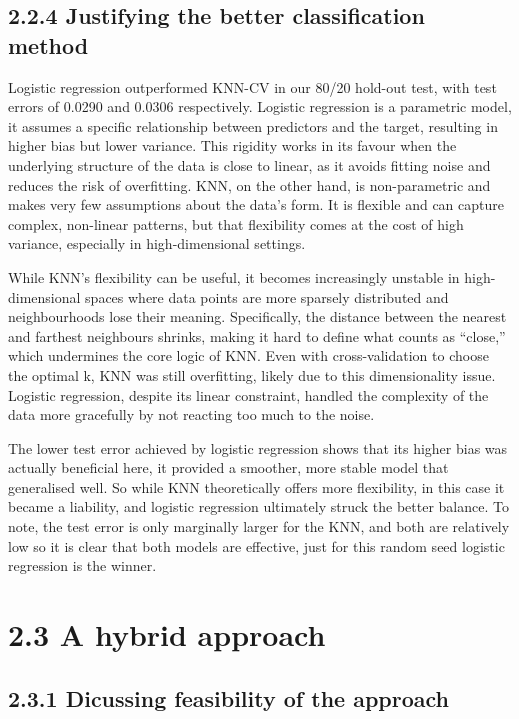 \documentclass[
]{article}
\begin{document}
\subsection{2.2.4 Justifying the better classification
method}\label{justifying-the-better-classification-method-1}

Logistic regression outperformed KNN-CV in our 80/20 hold-out test, with
test errors of 0.0290 and 0.0306 respectively. Logistic regression is a
parametric model, it assumes a specific relationship between predictors
and the target, resulting in higher bias but lower variance. This
rigidity works in its favour when the underlying structure of the data
is close to linear, as it avoids fitting noise and reduces the risk of
overfitting. KNN, on the other hand, is non-parametric and makes very
few assumptions about the data's form. It is flexible and can capture
complex, non-linear patterns, but that flexibility comes at the cost of
high variance, especially in high-dimensional settings.

While KNN's flexibility can be useful, it becomes increasingly unstable
in high-dimensional spaces where data points are more sparsely
distributed and neighbourhoods lose their meaning. Specifically, the
distance between the nearest and farthest neighbours shrinks, making it
hard to define what counts as ``close,'' which undermines the core logic
of KNN. Even with cross-validation to choose the optimal k, KNN was
still overfitting, likely due to this dimensionality issue. Logistic
regression, despite its linear constraint, handled the complexity of the
data more gracefully by not reacting too much to the noise.

The lower test error achieved by logistic regression shows that its
higher bias was actually beneficial here, it provided a smoother, more
stable model that generalised well. So while KNN theoretically offers
more flexibility, in this case it became a liability, and logistic
regression ultimately struck the better balance. To note, the test error
is only marginally larger for the KNN, and both are relatively low so it
is clear that both models are effective, just for this random seed
logistic regression is the winner.

\section{2.3 A hybrid approach}\label{a-hybrid-approach}

\subsection{2.3.1 Dicussing feasibility of the
approach}\label{dicussing-feasibility-of-the-approach}
\end{document}

